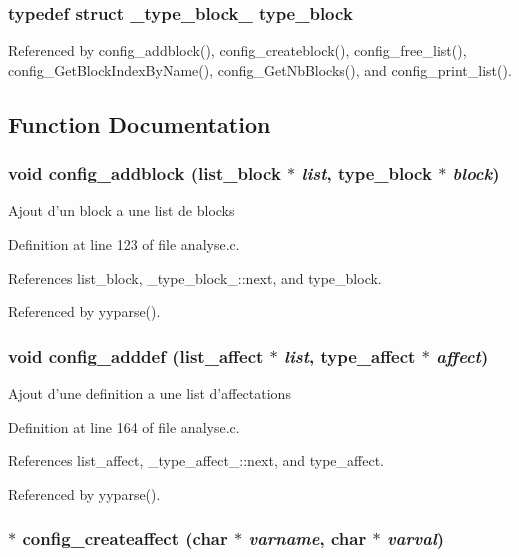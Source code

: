 \subsubsection{\setlength{\rightskip}{0pt plus 5cm}typedef struct {\bf \_\-type\_\-block\_\-}  {\bf type\_\-block}}\label{analyse_8h_a3}




Referenced by config\_\-addblock(), config\_\-createblock(), config\_\-free\_\-list(), config\_\-Get\-Block\-Index\-By\-Name(), config\_\-Get\-Nb\-Blocks(), and config\_\-print\_\-list().

\subsection{Function Documentation}
\subsubsection{\setlength{\rightskip}{0pt plus 5cm}void config\_\-addblock ({\bf list\_\-block} $\ast$ {\em list}, {\bf type\_\-block} $\ast$ {\em block})}\label{analyse_8h_a7}


Ajout d'un block a une list de blocks 

Definition at line 123 of file analyse.c.

References list\_\-block, \_\-type\_\-block\_\-::next, and type\_\-block.

Referenced by yyparse().
\subsubsection{\setlength{\rightskip}{0pt plus 5cm}void config\_\-adddef ({\bf list\_\-affect} $\ast$ {\em list}, {\bf type\_\-affect} $\ast$ {\em affect})}\label{analyse_8h_a10}


Ajout d'une definition a une list d'affectations 

Definition at line 164 of file analyse.c.

References list\_\-affect, \_\-type\_\-affect\_\-::next, and type\_\-affect.

Referenced by yyparse().
\subsubsection{$\ast$ config\_\-createaffect (char $\ast$ {\em varname}, char $\ast$ {\em varval})}\label{analyse_8h_a9}



